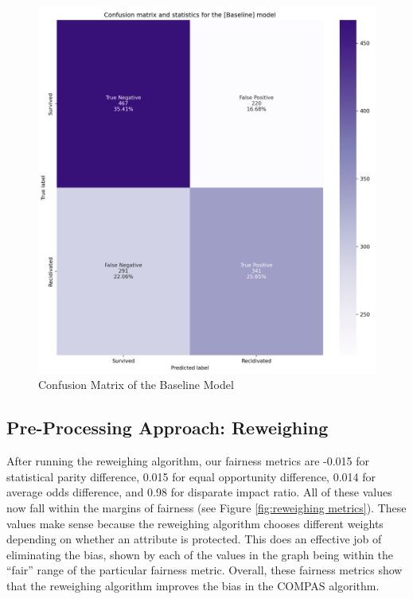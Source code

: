 \documentclass[water,article,submit,moreauthors,pdftex]{mdpi}
\begin{document}
\begin{figure}

{\centering \includegraphics[width=1\linewidth]{../images/baseline_matrix} 

}

\caption{Confusion Matrix of the Baseline Model}\label{fig:baseline matrix}
\end{figure}

\hypertarget{pre-processing-approach-reweighing}{%
\subsection{Pre-Processing Approach:
Reweighing}\label{pre-processing-approach-reweighing}}

After running the reweighing algorithm, our fairness metrics are -0.015
for statistical parity difference, 0.015 for equal opportunity
difference, 0.014 for average odds difference, and 0.98 for disparate
impact ratio. All of these values now fall within the margins of
fairness (see Figure \ref{fig:reweighing metrics}). These values make
sense because the reweighing algorithm chooses different weights
depending on whether an attribute is protected. This does an effective
job of eliminating the bias, shown by each of the values in the graph
being within the ``fair'' range of the particular fairness metric.
Overall, these fairness metrics show that the reweighing algorithm
improves the bias in the COMPAS algorithm.
\end{document}
